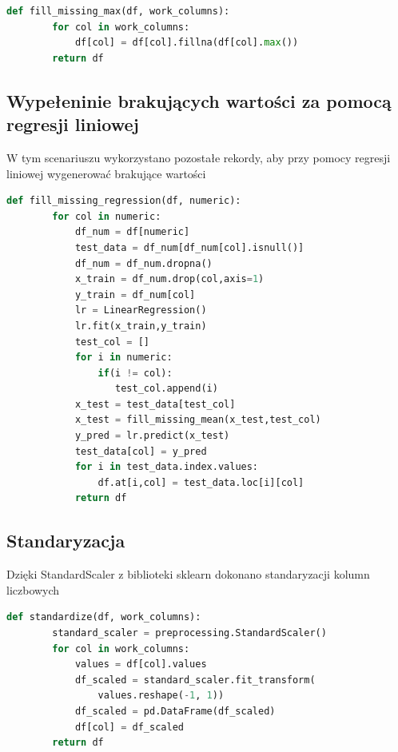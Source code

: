 \documentclass{article}
\begin{document}
\begin{lstlisting}[language=Python, caption={Wypełnienie brakujących wartości maksimum}, captionpos=b]
    def fill_missing_max(df, work_columns):
        for col in work_columns:
            df[col] = df[col].fillna(df[col].max())
        return df
\end{lstlisting}

\subsection{Wypełeninie brakujących wartości za pomocą regresji liniowej}
W tym scenariuszu wykorzystano pozostałe rekordy, 
aby przy pomocy regresji liniowej wygenerować 
brakujące wartości

\begin{lstlisting}[language=Python, caption={Wypełnienie brakujących wartości za pomocą regresji liniowej}, captionpos=b]
    def fill_missing_regression(df, numeric):    
        for col in numeric:
            df_num = df[numeric]
            test_data = df_num[df_num[col].isnull()]
            df_num = df_num.dropna()
            x_train = df_num.drop(col,axis=1)
            y_train = df_num[col]
            lr = LinearRegression()
            lr.fit(x_train,y_train)
            test_col = []
            for i in numeric:
                if(i != col):
                   test_col.append(i)
            x_test = test_data[test_col]
            x_test = fill_missing_mean(x_test,test_col)
            y_pred = lr.predict(x_test)
            test_data[col] = y_pred
            for i in test_data.index.values:
                df.at[i,col] = test_data.loc[i][col]
            return df
\end{lstlisting}

\subsection{Standaryzacja}
Dzięki StandardScaler z biblioteki sklearn dokonano 
standaryzacji kolumn liczbowych

\begin{lstlisting}[language=Python, caption={Standaryzacja kolumn liczbowych}, captionpos=b]
    def standardize(df, work_columns):
        standard_scaler = preprocessing.StandardScaler()
        for col in work_columns:
            values = df[col].values
            df_scaled = standard_scaler.fit_transform(
                values.reshape(-1, 1)) 
            df_scaled = pd.DataFrame(df_scaled)
            df[col] = df_scaled
        return df
\end{lstlisting}
\end{document}
